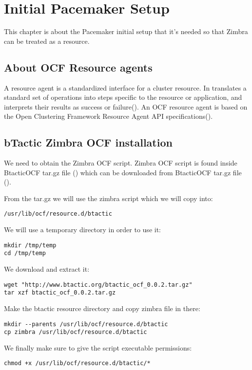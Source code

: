 

\chapter{Initial Pacemaker Setup}
\label{chap:initial-pacemaker-setup}
This chapter is about the Pacemaker initial setup that it's needed so that Zimbra can be treated as a resource.

\section {About OCF Resource agents}
A resource agent is a standardized interface for a cluster resource. In translates a standard set of operations into steps specific to the resource or application, and interprets their results as success or failure(\cite{ResourceAgentsWiki}). An OCF resource agent is based on the Open Clustering Framework Resource Agent API specifications(\cite{OCFResourceAgentsWiki}). 

\section {bTactic Zimbra OCF installation}
We need to obtain the Zimbra OCF script. Zimbra OCF script is found inside BtacticOCF tar.gz file (\cite{BtacticOCF}) which can be downloaded from BtacticOCF  tar.gz file (\cite{BtacticOrg}).

From the tar.gz we will use the zimbra script which we will copy into:
\begin{verbatim}
/usr/lib/ocf/resource.d/btactic
\end{verbatim}

We will use a temporary directory in order to use it:
\begin{verbatim}
mkdir /tmp/temp
cd /tmp/temp
\end{verbatim}
We download and extract it:
\begin{verbatim}
wget "http://www.btactic.org/btactic_ocf_0.0.2.tar.gz"
tar xzf btactic_ocf_0.0.2.tar.gz
\end{verbatim}
Make the btactic resource directory and copy zimbra file in there:
\begin{verbatim}
mkdir --parents /usr/lib/ocf/resource.d/btactic
cp zimbra /usr/lib/ocf/resource.d/btactic
\end{verbatim}
We finally make sure to give the script executable permissions:
\begin{verbatim}
chmod +x /usr/lib/ocf/resource.d/btactic/*
\end{verbatim}

